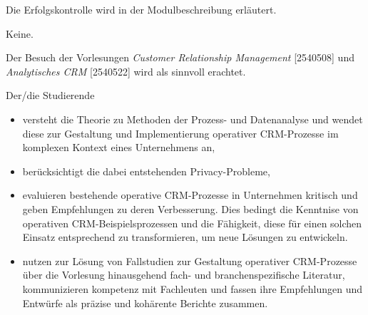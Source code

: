 \begin{course}

\setdoclanguagegerman
{}



\coursehead


\label{cour_4899.dp_997}


\begin{styleenv}
\begin{assessment}
Die Erfolgskontrolle wird in der Modulbeschreibung erläutert.


\end{assessment}

\begin{conditions}Keine.\end{conditions}

\begin{recommendations}Der Besuch der Vorlesungen \emph{Customer Relationship Management }[2540508] und \emph{Analytisches CRM} [2540522] wird als sinnvoll erachtet.

\end{recommendations}
\end{styleenv}

\begin{learningoutcomes}
Der/die Studierende

 \begin{itemize}\item versteht die Theorie zu Methoden der Prozess- und Datenanalyse und wendet diese zur Gestaltung und Implementierung operativer CRM-Prozesse im komplexen Kontext eines Unternehmens an,  \item berücksichtigt die dabei entstehenden Privacy-Probleme,  \item evaluieren bestehende operative CRM-Prozesse in Unternehmen kritisch und geben Empfehlungen zu deren Verbesserung. Dies bedingt die Kenntnise von operativen CRM-Beispielsprozessen und die Fähigkeit, diese für einen solchen Einsatz entsprechend zu transformieren, um neue Lösungen zu entwickeln.  \item nutzen zur Lösung von Fallstudien zur Gestaltung operativer CRM-Prozesse über die Vorlesung hinausgehend fach- und branchenspezifische Literatur, kommunizieren kompetenz mit Fachleuten und fassen ihre Empfehlungen und Entwürfe als präzise und kohärente Berichte zusammen.  \end{itemize}
\end{learningoutcomes}


\end{course}
